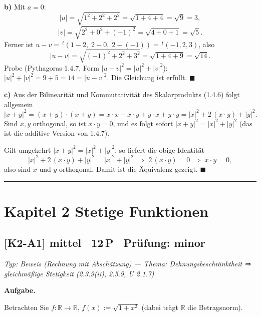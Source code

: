 \documentclass[a4paper,11pt]{article}
\providecommand{\qed}{\hfill\ensuremath{\blacksquare}}
\begin{document}
\textbf{b)} Mit $a=0$:
\[ |u|=\sqrt{1^2+2^2+2^2}=\sqrt{1+4+4}=\sqrt{9}=3, \]
\[ |v|=\sqrt{2^2+0^2+(-1)^2}=\sqrt{4+0+1}=\sqrt{5}. \]
Ferner ist $u-v=\,^{t}(1-2,\;2-0,\;2-(-1))=\,^{t}(-1,2,3)$, also
\[ |u-v|=\sqrt{(-1)^2+2^2+3^2}=\sqrt{1+4+9}=\sqrt{14}. \]
Probe (Pythagoras 1.4.7, Form $|u-v|^2=|u|^2+|v|^2$): $|u|^2+|v|^2=9+5=14=|u-v|^2$. Die Gleichung ist erfüllt. \qed

\textbf{c)} Aus der Bilinearität und Kommutativität des Skalarprodukts (1.4.6) folgt allgemein
\[ |x+y|^2=(x+y)\cdot(x+y)=x\cdot x+x\cdot y+y\cdot x+y\cdot y=|x|^2+2\,(x\cdot y)+|y|^2. \]
Sind $x,y$ orthogonal, so ist $x\cdot y=0$, und es folgt sofort $|x+y|^2=|x|^2+|y|^2$ (das ist die additive Version von 1.4.7).

Gilt umgekehrt $|x+y|^2=|x|^2+|y|^2$, so liefert die obige Identität
\[ |x|^2+2\,(x\cdot y)+|y|^2=|x|^2+|y|^2 \;\Longrightarrow\; 2\,(x\cdot y)=0 \;\Longrightarrow\; x\cdot y=0, \]
also sind $x$ und $y$ orthogonal. Damit ist die Äquivalenz gezeigt. \qed\par\bigskip\hrule\bigskip
\section*{Kapitel 2 \quad Stetige Funktionen}
\subsection*{[K2-A1] \normalfont mittel \textbullet\ 12\,P \textbullet\ Pr\"ufung: minor}
\textit{Typ: Beweis (Rechnung mit Abschätzung)  ---  Thema: Dehnungsbeschränktheit ⇒ gleichmäßige Stetigkeit (2.3.9(ii), 2.5.9, U 2.1.7)}\par\smallskip
\textbf{Aufgabe.}\par
Betrachten Sie $f:\mathbb{R}\to\mathbb{R}$, $f(x):=\sqrt{1+x^2}$ (dabei trägt $\mathbb{R}$ die Betragsnorm).
\end{document}
